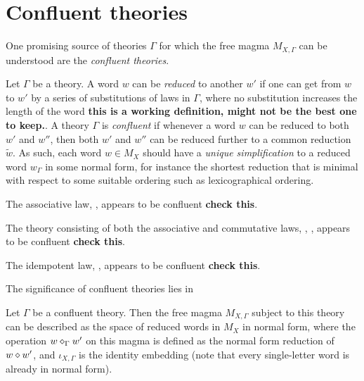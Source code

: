 \section{Confluent theories}

One promising source of theories $\Gamma$ for which the free magma $M_{X,\Gamma}$ can be understood are the \emph{confluent theories}.

\begin{definition}\label{confluent-theory}  Let $\Gamma$ be a theory.  A word $w$ can be \emph{reduced} to another $w'$ if one can get from $w$ to $w'$ by a series of substitutions of laws in $\Gamma$, where no substitution increases the length of the word {\bf this is a working definition, might not be the best one to keep.}.  A theory $\Gamma$ is \emph{confluent} if whenever a word $w$ can be reduced to both $w'$ and $w''$, then both $w'$ and $w''$ can be reduced further to a common reduction $\tilde w$.  As such, each word $w \in M_X$ should have a \emph{unique simplification} to a reduced word $w_\Gamma$ in some normal form, for instance the shortest reduction that is minimal with respect to some suitable ordering such as lexicographical ordering.
\end{definition}

\begin{example}  The associative law, , appears to be confluent {\bf check this}.
\end{example}

\begin{example}  The theory consisting of both the associative and commutative laws, , , appears to be confluent {\bf check this}.
\end{example}

\begin{example}  The idempotent law, , appears to be confluent {\bf check this}.
\end{example}

The significance of confluent theories lies in

\begin{theorem}\label{free-confluent}  Let $\Gamma$ be a confluent theory.  Then the free magma $M_{X,\Gamma}$ subject to this theory can be described as the space of reduced words in $M_X$ in normal form, where the operation $w \diamond_\Gamma w'$ on this magma is defined as the normal form reduction of $w \diamond w'$, and $\iota_{X,\Gamma}$ is the identity embedding (note that every single-letter word is already in normal form).
\end{theorem}

